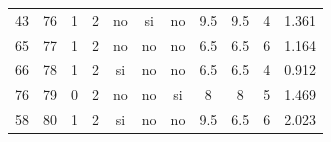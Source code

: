 \documentclass[12pt,a4paper,twoside,openright,titlepage,final]{article}
\begin{document}
\begin{appendices}
\begin{landscape}
\begin{center}
\begin{longtable}{@{\extracolsep{\fill}}*{11}{c}}
							43       & 76           & 1         & 2       & no   & si        & no           & 9.5        & 9.5           & 4             & 1.361  \\
							65       & 77           & 1         & 2       & no   & no        & no           & 6.5        & 6.5           & 6             & 1.164  \\
							66       & 78           & 1         & 2       & si   & no        & no           & 6.5        & 6.5           & 4             & 0.912  \\
							76       & 79           & 0         & 2       & no   & no        & si           & 8          & 8             & 5             & 1.469  \\
							58       & 80           & 1         & 2       & si   & no        & no           & 9.5        & 6.5           & 6             & 2.023 \\
							
						\end{longtable}
					\end{center}
				\end{landscape}
	
\end{appendices}
\end{document}
